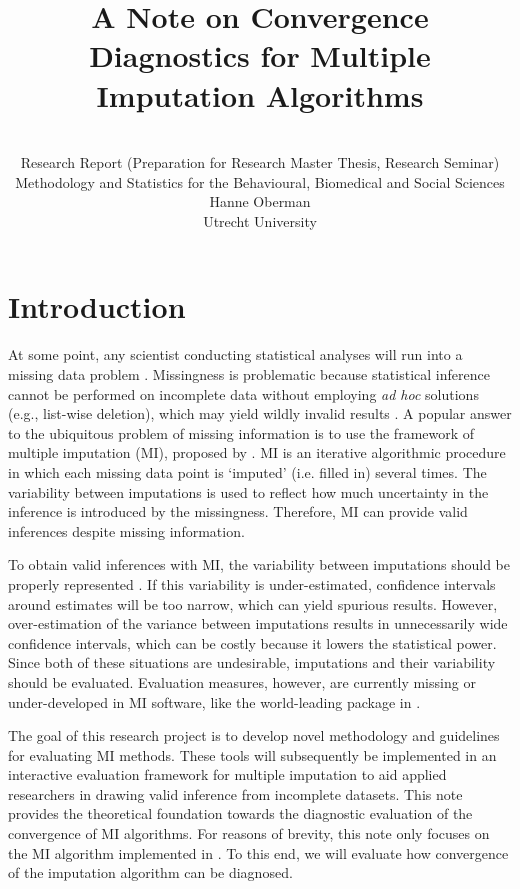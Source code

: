 \documentclass[article]{jss}
\author{\\Research Report (Preparation for Research Master Thesis, Research Seminar) \\ Methodology and Statistics for the Behavioural, Biomedical and Social Sciences \AND Hanne Oberman\\Utrecht University}
\title{A Note on Convergence Diagnostics for Multiple Imputation Algorithms}
\begin{document}

\section{Introduction} \label{sec:intro} %

At some point, any scientist conducting statistical analyses will run into a missing data problem \citep{alli02}. Missingness is problematic because statistical inference cannot be performed on incomplete data without employing \emph{ad hoc} solutions (e.g., list-wise deletion), which may yield wildly invalid results \citep{buur18}. A popular answer to the ubiquitous problem of missing information is to use the framework of multiple imputation (MI), proposed by \cite{rubin87}. MI is an iterative algorithmic procedure in which each missing data point is `imputed' (i.e. filled in) several times. The variability between imputations is used to reflect how much uncertainty in the inference is introduced by the missingness. Therefore, MI can provide valid inferences despite missing information. 

To obtain valid inferences with MI, the variability between imputations should be properly represented \citep{rubin87, buur18}. If this variability is under-estimated, confidence intervals around estimates will be too narrow, which can yield spurious results. However, over-estimation of the variance between imputations results in unnecessarily wide confidence intervals, which can be costly because it lowers the statistical power. Since both of these situations are undesirable, imputations and their variability should be evaluated. Evaluation measures, however, are currently missing or under-developed in MI software, like the world-leading  package \citep{mice} in  \citep{R}. %

The goal of this research project is to develop novel methodology and guidelines for evaluating MI methods. These tools will subsequently be implemented in an interactive evaluation framework for multiple imputation to aid applied researchers in drawing valid inference from incomplete datasets. This note provides the theoretical foundation towards the diagnostic evaluation of the convergence of MI algorithms. %
For reasons of brevity, this note only focuses on the MI algorithm implemented in  \cite{mice}. %
To this end, we will evaluate how convergence of the imputation algorithm can be diagnosed.
\end{document}
